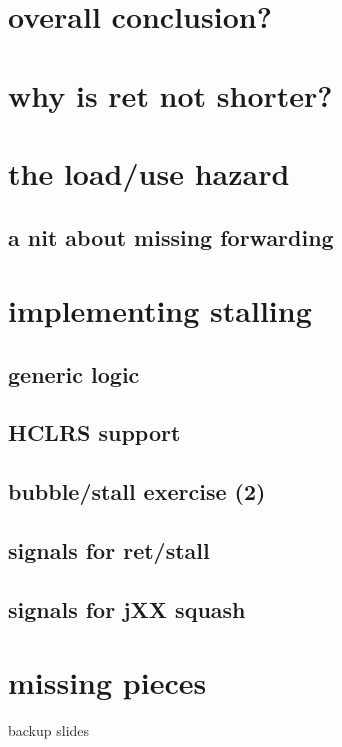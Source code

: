 
\begin{frame}
    \titlepage
\end{frame}






\section{overall conclusion?}


\section{why is ret not shorter?}


\section{the load/use hazard}


\subsection{a nit about missing forwarding}


\section{implementing stalling}

\subsection{generic logic}


\subsection{HCLRS support}


\subsection{bubble/stall exercise (2)}


\subsection{signals for ret/stall}




\subsection{signals for jXX squash}



\section{missing pieces}







\begin{frame}{backup slides}
\end{frame}


